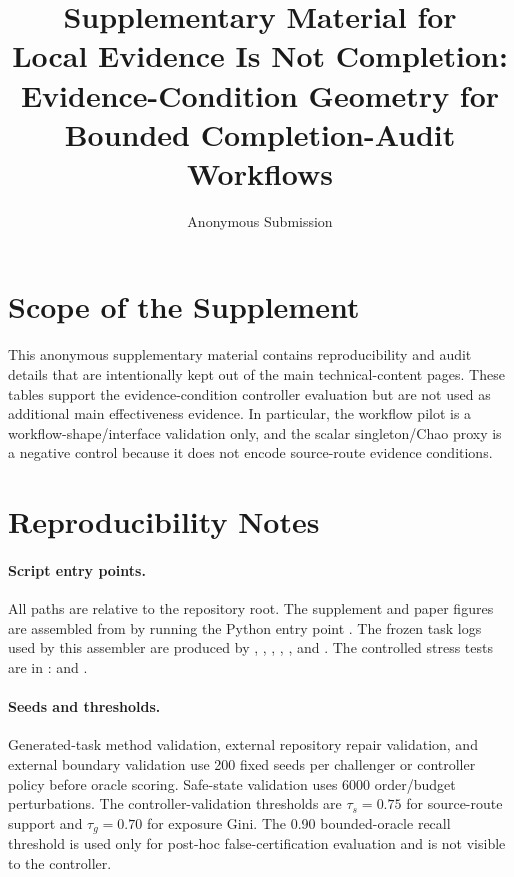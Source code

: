 \documentclass[letterpaper,10pt]{article}
\title{Supplementary Material for\\
Local Evidence Is Not Completion:\\
Evidence-Condition Geometry for Bounded Completion-Audit Workflows}
\author{Anonymous Submission}
\date{}
\begin{document}
\sloppy
\maketitle

\section*{Scope of the Supplement}

This anonymous supplementary material contains reproducibility and audit details
that are intentionally kept out of the main technical-content pages. These
tables support the evidence-condition controller evaluation but are not used as
additional main effectiveness evidence. In particular, the workflow pilot is a
workflow-shape/interface validation only, and the scalar singleton/Chao proxy is
a negative control because it does not encode source-route evidence conditions.

\section*{Reproducibility Notes}

\paragraph{Script entry points.}
All paths are relative to the repository root. The supplement and paper figures
are assembled from 
by running the Python entry point
. The frozen task logs
used by this assembler are produced by
,
,
,
,
, and
. The controlled
stress tests are in :
 and
.

\paragraph{Seeds and thresholds.}
Generated-task method validation, external repository repair validation, and
external boundary validation use 200 fixed seeds per challenger or controller
policy before oracle scoring. Safe-state validation uses 6000 order/budget
perturbations. The controller-validation thresholds are
\(\tau_s=0.75\) for source-route support and \(\tau_g=0.70\) for exposure
Gini. The 0.90 bounded-oracle recall threshold is used only for post-hoc
false-certification evaluation and is not visible to the controller.
\end{document}
